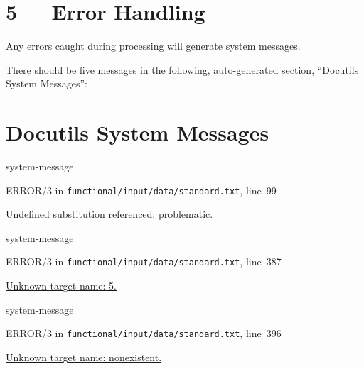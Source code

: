 \documentclass[a4paper]{article}
\begin{document}


\section{5   Error Handling%
  \label{error-handling}%
}

Any errors caught during processing will generate system messages.

There should be five messages in the following, auto-generated
section, “Docutils System Messages”:



\section[Docutils System Messages]{\color{red}Docutils System Messages%
}

\begin{DUclass}{system-message}
\begin{DUadmonition}

{\color{red}ERROR/3} in \texttt{functional/input/data/standard.txt}, line~99

\hyperlink{problematic-1}{
Undefined substitution referenced: \textquotedbl{}problematic\textquotedbl{}.
}\end{DUadmonition}
\end{DUclass}

\begin{DUclass}{system-message}
\begin{DUadmonition}

{\color{red}ERROR/3} in \texttt{functional/input/data/standard.txt}, line~387

\hyperlink{footnote-reference-8}{
Unknown target name: \textquotedbl{}5\textquotedbl{}.
}\end{DUadmonition}
\end{DUclass}

\begin{DUclass}{system-message}
\begin{DUadmonition}

{\color{red}ERROR/3} in \texttt{functional/input/data/standard.txt}, line~396

\hyperlink{citation-reference-3}{
Unknown target name: \textquotedbl{}nonexistent\textquotedbl{}.
}\end{DUadmonition}
\end{DUclass}
\end{document}
